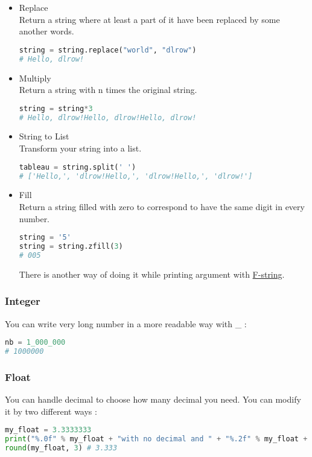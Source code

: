 \documentclass[a4paper, 12pt, titlepage]{scrartcl} %
\begin{document}
\begin{itemize}
\item Replace \\
Return a string where at least a part of it have been replaced by some another words.
\begin{lstlisting}[language=Python]
string = string.replace("world", "dlrow")
# Hello, dlrow!
\end{lstlisting}

\item Multiply \\
Return a string with n times the original string.
\begin{lstlisting}[language=Python]
string = string*3
# Hello, dlrow!Hello, dlrow!Hello, dlrow!
\end{lstlisting}

\item String to List \\
Transform your string into a list.
\begin{lstlisting}[language=Python]
tableau = string.split(' ')
# ['Hello,', 'dlrow!Hello,', 'dlrow!Hello,', 'dlrow!']
\end{lstlisting}

\item Fill \\
Return a string filled with zero to correspond to have the same digit in every number.
\begin{lstlisting}[language=Python]
string = '5'
string = string.zfill(3)
# 005
\end{lstlisting}

There is another way of doing it while printing argument with \hyperref[subsec:F-string]{F-string}.
\end{itemize}

\subsubsection{Integer}
You can write very long number in a more readable way with \_ : 
\begin{lstlisting}[language=Python]
nb = 1_000_000
# 1000000
\end{lstlisting}

\subsubsection{Float}
You can handle decimal to choose how many decimal you need. You can modify it by two different ways : 
\begin{lstlisting}[language=Python]
my_float = 3.3333333
print("%.0f" % my_float + "with no decimal and " + "%.2f" % my_float + "with two decimals") #3 with no decimal and 3.33 with two decimals
round(my_float, 3) # 3.333
\end{lstlisting}
\end{document}
